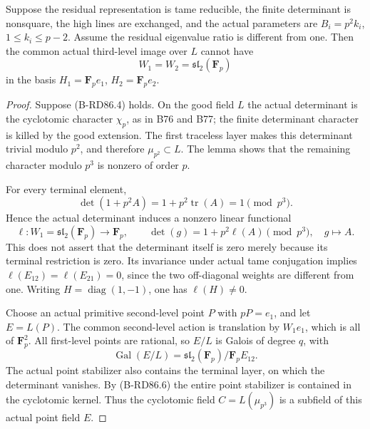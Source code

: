 \begin{proposition}
\label{prop:B-RD86-traceless}
Suppose the residual representation is tame reducible,
the finite determinant is nonsquare, the high lines
are exchanged, and the actual parameters are
\(B_i=p^2k_i\), \(1\le k_i\le p-2\).
Assume the residual eigenvalue ratio is different
from one. Then the common actual third-level image
over \(L\) cannot have
\[
                  W_1=W_2=\mathfrak{sl}_2(\mathbf F_p)
                                                        \tag{B-RD86.4}
\]
in the basis \(H_1=\mathbf F_pe_1\),
\(H_2=\mathbf F_pe_2\).
\end{proposition}
\begin{proof}
Suppose (B-RD86.4) holds. On the good field \(L\)
the actual determinant is the cyclotomic character
\(\chi_p\), as in B76 and B77; the finite determinant
character is killed by the good extension. The first
traceless layer makes this determinant trivial modulo
\(p^2\), and therefore \(\mu_{p^2}\subset L\).
The lemma shows that the remaining character modulo
\(p^3\) is nonzero of order \(p\).

For every terminal element,
\[
       \det(1+p^2A)=1+p^2\operatorname{tr}(A)=1
                        \pmod{p^3}.                  \tag{B-RD86.5}
\]
Hence the actual determinant induces a nonzero linear
functional
\[
 \ell:W_1=\mathfrak{sl}_2(\mathbf F_p)\longrightarrow
 \mathbf F_p,\qquad
 \det(g)=1+p^2\ell(A)\pmod{p^3},\quad g\mapsto A.
                                                        \tag{B-RD86.6}
\]
This does not assert that the determinant itself is
zero merely because its terminal restriction is zero.
Its invariance under actual tame conjugation implies
\(\ell(E_{12})=\ell(E_{21})=0\), since the two
off-diagonal weights are different from one.
Writing \(H=\operatorname{diag}(1,-1)\), one has
\(\ell(H)\ne0\).

Choose an actual primitive second-level point \(P\)
with \(pP=e_1\), and let \(E=L(P)\). The common
second-level action is translation by \(W_1e_1\),
which is all of \(\mathbf F_p^2\). All first-level
points are rational, so \(E/L\) is Galois of degree
\(q\), with
\[
 \operatorname{Gal}(E/L)=
      \mathfrak{sl}_2(\mathbf F_p)/\mathbf F_pE_{12}.
                                                        \tag{B-RD86.7}
\]
The actual point stabilizer also contains the terminal
layer, on which the determinant vanishes. By (B-RD86.6)
the entire point stabilizer is contained in the
cyclotomic kernel. Thus the cyclotomic field
\(C=L(\mu_{p^3})\) is a subfield of this actual point
field \(E\).


\end{proof}
